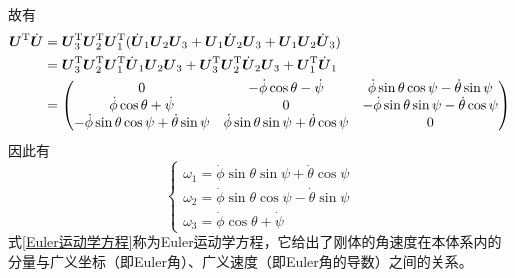 故有
\begin{align*}
	\boldsymbol{U}^{\mathrm{T}} \dot{\boldsymbol{U}} & = \boldsymbol{U}_3^{\mathrm{T}} \boldsymbol{U}_2^{\mathrm{T}} \boldsymbol{U}_1^{\mathrm{T}} (\dot{\boldsymbol{U}}_1 \boldsymbol{U}_2 \boldsymbol{U}_3 + \boldsymbol{U}_1 \dot{\boldsymbol{U}}_2 \boldsymbol{U}_3 + \boldsymbol{U}_1 \boldsymbol{U}_2 \dot{\boldsymbol{U}}_3) \\
	& = \boldsymbol{U}_3^{\mathrm{T}} \boldsymbol{U}_2^{\mathrm{T}} \boldsymbol{U}_1^{\mathrm{T}} \dot{\boldsymbol{U}}_1 \boldsymbol{U}_2 \boldsymbol{U}_3 + \boldsymbol{U}_3^{\mathrm{T}} \boldsymbol{U}_2^{\mathrm{T}} \dot{\boldsymbol{U}}_2 \boldsymbol{U}_3 + \boldsymbol{U}_1^{\mathrm{T}} \dot{\boldsymbol{U}}_1 \\
	& = \begin{pmatrix}
		0 & -\dot{\phi} \cos \theta - \dot{\psi} & \dot{\phi} \sin \theta \cos \psi - \dot{\theta} \sin \psi \\
		\dot{\phi} \cos \theta + \dot{\psi} & 0 & -\dot{\phi} \sin \theta \sin \psi - \dot{\theta} \cos \psi \\
		- \dot{\phi} \sin \theta \cos \psi + \dot{\theta} \sin \psi & \dot{\phi} \sin \theta \sin \psi + \dot{\theta} \cos \psi & 0
	\end{pmatrix}
\end{align*}
因此有
\begin{equation}
	\begin{cases}
		\omega_1 = \dot{\phi} \sin \theta \sin \psi + \dot{\theta} \cos \psi \\
		\omega_2 = \dot{\phi} \sin \theta \cos \psi - \dot{\theta} \sin \psi \\
		\omega_3 = \dot{\phi} \cos \theta + \dot{\psi}
	\end{cases}
	\label{Euler运动学方程}
\end{equation}
式\eqref{Euler运动学方程}称为{\heiti Euler运动学方程}，它给出了刚体的角速度在本体系内的分量与广义坐标（即Euler角）、广义速度（即Euler角的导数）之间的关系。

